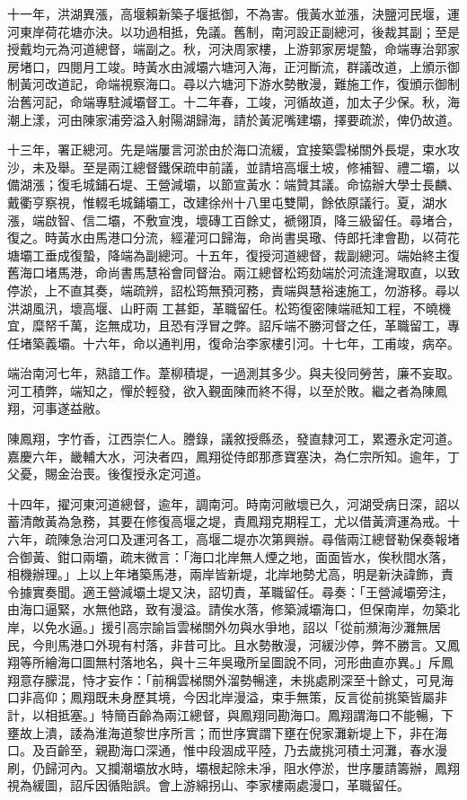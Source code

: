\begin{pinyinscope}
十一年，洪湖異漲，高堰賴新築子堰抵御，不為害。俄黃水並漲，決鹽河民堰，運河東岸荷花塘亦決。以功過相抵，免議。舊制，南河設正副總河，後裁其副；至是授戴均元為河道總督，端副之。秋，河決周家樓，上游郭家房堤蟄，命端專治郭家房堵口，四閱月工竣。時黃水由減壩六塘河入海，正河斷流，群議改道，上頒示御制黃河改道記，命端視察海口。尋以六塘河下游水勢散漫，難施工作，復頒示御制治舊河記，命端專駐減壩督工。十二年春，工竣，河循故道，加太子少保。秋，海潮上漾，河由陳家浦旁溢入射陽湖歸海，請於黃泥嘴建壩，擇要疏淤，俾仍故道。

十三年，署正總河。先是端屢言河淤由於海口流緩，宜接築雲梯關外長堤，束水攻沙，未及舉。至是兩江總督鐵保疏申前議，並請培高堰土坡，修補智、禮二壩，以備湖漲；復毛城鋪石堤、王營減壩，以節宣黃水：端贊其議。命協辦大學士長麟、戴衢亨察視，惟輟毛城鋪壩工，改建徐州十八里屯雙閘，餘依原議行。夏，湖水漲，端啟智、信二壩，不敷宣洩，壞磚工百餘丈，褫翎頂，降三級留任。尋堵合，復之。時黃水由馬港口分流，經灌河口歸海，命尚書吳璥、侍郎托津會勘，以荷花塘壩工垂成復蟄，降端為副總河。十五年，復授河道總督，裁副總河。端始終主復舊海口堵馬港，命尚書馬慧裕會同督治。兩江總督松筠劾端於河流逢灣取直，以致停淤，上不直其奏，端疏辨，詔松筠無預河務，責端與慧裕速施工，勿游移。尋以洪湖風汛，壞高堰、山盱兩工甚鉅，革職留任。松筠復密陳端祗知工程，不曉機宜，糜帑千萬，迄無成功，且恐有浮冒之弊。詔斥端不勝河督之任，革職留工，專任堵築義壩。十六年，命以通判用，復命治李家樓引河。十七年，工甫竣，病卒。

端治南河七年，熟諳工作。葦柳積堤，一過測其多少。與夫役同勞苦，廉不妄取。河工積弊，端知之，憚於輕發，欲入覲面陳而終不得，以至於敗。繼之者為陳鳳翔，河事遂益敝。

陳鳳翔，字竹香，江西崇仁人。謄錄，議敘授縣丞，發直隸河工，累遷永定河道。嘉慶六年，畿輔大水，河決者四，鳳翔從侍郎那彥寶塞決，為仁宗所知。逾年，丁父憂，賜金治喪。後復授永定河道。

十四年，擢河東河道總督，逾年，調南河。時南河敝壞已久，河湖受病日深，詔以蓄清敵黃為急務，其要在修復高堰之堤，責鳳翔克期程工，尤以借黃濟運為戒。十六年，疏陳急治河口及運河各工，高堰二堤亦次第興辦。尋偕兩江總督勒保奏報堵合御黃、鉗口兩壩，疏末微言：「海口北岸無人煙之地，面面皆水，俟秋間水落，相機辦理。」上以上年堵築馬港，兩岸皆新堤，北岸地勢尤高，明是新決諱飾，責令據實奏聞。適王營減壩土堤又決，詔切責，革職留任。尋奏：「王營減壩旁注，由海口逼緊，水無他路，致有漫溢。請俟水落，修築減壩海口，但保南岸，勿築北岸，以免水逼。」援引高宗諭旨雲梯關外勿與水爭地，詔以「從前瀕海沙灘無居民，今則馬港口外現有村落，非昔可比。且水勢散漫，河緩沙停，弊不勝言。又鳳翔等所繪海口圖無村落地名，與十三年吳璥所呈圖說不同，河形曲直亦異。」斥鳳翔意存朦混，恃才妄作：「前稱雲梯關外溜勢暢達，未挑處刷深至十餘丈，可見海口非高仰；鳳翔既未身歷其境，今因北岸漫溢，束手無策，反言從前挑築皆屬非計，以相抵塞。」特簡百齡為兩江總督，與鳳翔同勘海口。鳳翔謂海口不能暢，下壅故上潰，諉為淮海道黎世序所言；而世序實謂下壅在倪家灘新堤上下，非在海口。及百齡至，親勘海口深通，惟中段涸成平陸，乃去歲挑河積土河灘，春水漫刷，仍歸河內。又攔潮壩放水時，壩根起除未凈，阻水停淤，世序屢請籌辦，鳳翔視為緩圖，詔斥因循貽誤。會上游綿拐山、李家樓兩處漫口，革職留任。


\end{pinyinscope}
